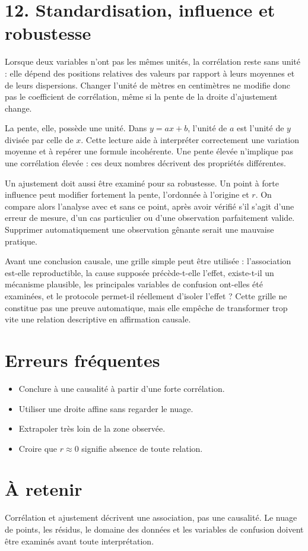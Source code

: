 \section{12. Standardisation, influence et robustesse}
Lorsque deux variables n'ont pas les mêmes unités, la corrélation reste sans unité : elle dépend des positions relatives des valeurs par rapport à leurs moyennes et de leurs dispersions. Changer l'unité de mètres en centimètres ne modifie donc pas le coefficient de corrélation, même si la pente de la droite d'ajustement change.

La pente, elle, possède une unité. Dans $y=ax+b$, l'unité de $a$ est l'unité de $y$ divisée par celle de $x$. Cette lecture aide à interpréter correctement une variation moyenne et à repérer une formule incohérente. Une pente élevée n'implique pas une corrélation élevée : ces deux nombres décrivent des propriétés différentes.

Un ajustement doit aussi être examiné pour sa robustesse. Un point à forte influence peut modifier fortement la pente, l'ordonnée à l'origine et $r$. On compare alors l'analyse avec et sans ce point, après avoir vérifié s'il s'agit d'une erreur de mesure, d'un cas particulier ou d'une observation parfaitement valide. Supprimer automatiquement une observation gênante serait une mauvaise pratique.

Avant une conclusion causale, une grille simple peut être utilisée : l'association est-elle reproductible, la cause supposée précède-t-elle l'effet, existe-t-il un mécanisme plausible, les principales variables de confusion ont-elles été examinées, et le protocole permet-il réellement d'isoler l'effet ? Cette grille ne constitue pas une preuve automatique, mais elle empêche de transformer trop vite une relation descriptive en affirmation causale.

\section{Erreurs fréquentes}
\begin{itemize}
\item Conclure à une causalité à partir d'une forte corrélation.
\item Utiliser une droite affine sans regarder le nuage.
\item Extrapoler très loin de la zone observée.
\item Croire que $r\approx0$ signifie absence de toute relation.
\end{itemize}
\section{À retenir}
\begin{aretenir}
Corrélation et ajustement décrivent une association, pas une causalité. Le nuage de points, les résidus, le domaine des données et les variables de confusion doivent être examinés avant toute interprétation.
\end{aretenir}
